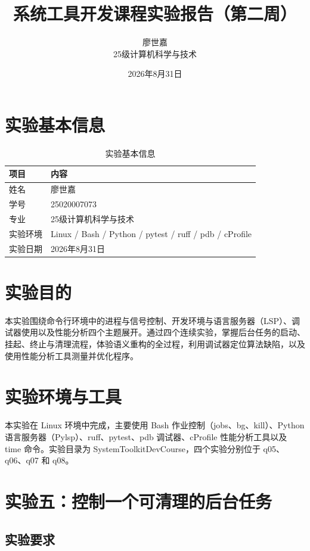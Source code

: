 \documentclass[UTF8]{ctexart}
\title{\textbf{系统工具开发课程实验报告（第二周）}}
\author{廖世嘉 \quad 25020007073 \\ 25级计算机科学与技术}
\date{2026年8月31日}
\begin{document}
\maketitle
\tableofcontents
\newpage

\section{实验基本信息}

\begin{table}[htbp]
\centering
\caption{实验基本信息}
\label{tab:info}
\begin{tabular}{ll}
\toprule
项目 & 内容 \\
\midrule
姓名 & 廖世嘉 \\
学号 & 25020007073 \\
专业 & 25级计算机科学与技术 \\
实验环境 & Linux / Bash / Python / pytest / ruff / pdb / cProfile \\
实验日期 & 2026年8月31日 \\
\bottomrule
\end{tabular}
\end{table}

\section{实验目的}

本实验围绕命令行环境中的进程与信号控制、开发环境与语言服务器（LSP）、调试器使用以及性能分析四个主题展开。通过四个连续实验，掌握后台任务的启动、挂起、终止与清理流程，体验语义重构的全过程，利用调试器定位算法缺陷，以及使用性能分析工具测量并优化程序。

\section{实验环境与工具}

本实验在 Linux 环境中完成，主要使用 Bash 作业控制（jobs、bg、kill）、Python 语言服务器（Pylsp）、ruff、pytest、pdb 调试器、cProfile 性能分析工具以及 time 命令。实验目录为 SystemToolkitDevCourse，四个实验分别位于 q05、q06、q07 和 q08。

\section{实验五：控制一个可清理的后台任务}

\subsection{实验要求}
\end{document}

